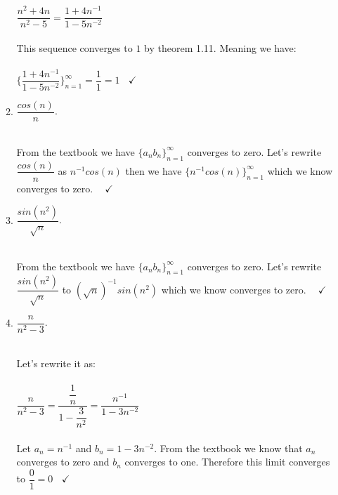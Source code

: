 \documentclass[fleqn]{article}
\begin{document}
\begin{enumerate}
\begin{enumerate}
        \textcolor{hwColor}{
          $
            \dfrac{n^2+4n}{n^2-5}=\dfrac{1+4n^{-1}}{1-5n^{-2}}
          $
          \\
          \\
          This sequence converges to $1$ by theorem 1.11. Meaning we have:
          \\
          \\
          $
            \{\dfrac{1+4n^{-1}}{1-5n^{-2}}\}_{n=1}^{\infty}=\dfrac{1}{1}=1 ~~~~ \checkmark 
          $
          \\
        }

      \item $\dfrac{cos(n)}{n}$.
      
        \textcolor{hwColor}{
          \\
          From the textbook we have $\{a_n b_n\}_{n=1}^{\infty}$ converges to zero. Let's rewrite 
          $\dfrac{cos(n)}{n}$ as $n^{-1} cos(n)$ then we have $\{n^{-1} cos(n)\}_{n=1}^{\infty}$ which 
          we know converges to zero. $~~~~ \checkmark$
          \\
        }
      
      \item $\dfrac{sin(n^2)}{\sqrt{n}}$.
      
        \textcolor{hwColor}{
          \\
          From the textbook we have $\{a_n b_n\}_{n=1}^{\infty}$ converges to zero. Let's rewrite
          $\dfrac{sin(n^2)}{\sqrt{n}}$ to $(\sqrt{n})^{-1}sin(n^2)$  which 
          we know converges to zero. $~~~~ \checkmark$
          \\
        }
      
      \item $\dfrac{n}{n^2-3}$.
      
        \textcolor{hwColor}{
          \\
          Let's rewrite it as:
          \\
          \\
          $
            \dfrac{n}{n^2-3}=\dfrac{\dfrac{1}{n}}{1-\dfrac{3}{n^2}}=\dfrac{n^{-1}}{1-3n^{-2}}
          $
          \\
          \\
          Let $a_n=n^{-1}$ and $b_n=1-3n^{-2}$. From the textbook we know that $a_n$ converges to zero and
          $b_n$ converges to one. Therefore this limit converges to $\dfrac{0}{1}=0 ~~~~ \checkmark$
          \\
        }
      

\end{enumerate}
\end{enumerate}
\end{document}
